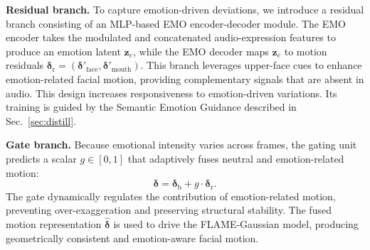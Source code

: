 \noindent \textbf{Residual branch.}
To capture emotion-driven deviations, we introduce a residual branch consisting of an MLP-based EMO encoder-decoder module. The EMO encoder takes the modulated and concatenated audio-expression features to produce an emotion latent $\mathbf{z}_e$, while the EMO decoder maps $\mathbf{z}_e$ to motion residuals ${\boldsymbol{\delta}}_{\text{r}}=(\boldsymbol{\delta}'_{\text{face}}, \boldsymbol{\delta}'_{\text{mouth}})$. This branch leverages upper-face cues to enhance emotion-related facial motion, providing complementary signals that are absent in audio. This design increases responsiveness to emotion-driven variations. Its training is guided by the Semantic Emotion Guidance described in Sec.~\ref{sec:distill}.

\noindent \textbf{Gate branch.}
Because emotional intensity varies across frames, the gating unit predicts a scalar \(g \in [0,1]\) that adaptively fuses neutral and emotion-related motion:
\begin{equation}
{\boldsymbol{\delta}}
= {\boldsymbol{\delta}}_{\text{b}} + g \cdot {\boldsymbol{\delta}}_{\text{r}}.
\label{eq:grmn-fuse}
\end{equation}
The gate dynamically regulates the contribution of emotion-related motion, preventing over-exaggeration and preserving structural stability. The fused motion representation \(\hat{\boldsymbol{\delta}}\) is used to drive the FLAME-Gaussian model, producing geometrically consistent and emotion-aware facial motion.


